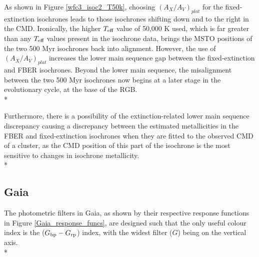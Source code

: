 \documentclass[12pt, a4paper]{report}
\begin{document}
As shown in Figure \ref{wfc3_isoc2_T50k}, choosing $(A_{X}/A_{V})_{plat}$ for the fixed-extinction isochrones leads to those isochrones shifting down and to the right in the CMD. Ironically, the higher $T_{\textnormal{eff}}$ value of 50,000 K used, which is far greater than any $T_{\textnormal{eff}}$ values present in the isochrone data, brings the MSTO positions of the two 500 Myr isochrones back into alignment. However, the use of $(A_{X}/A_{V})_{plat}$ increases the lower main sequence gap between the fixed-extinction and FBER isochrones. Beyond the lower main sequence, the misalignment between the two 500 Myr isochrones now begins at a later stage in the evolutionary cycle, at the base of the RGB. \\*

Furthermore, there is a possibility of the extinction-related lower main sequence discrepancy causing a discrepancy between the estimated metallicities in the FBER and fixed-extinction isochrones when they are fitted to the observed CMD of a cluster, as the CMD position of this part of the isochrone is the most sensitive to changes in isochrone metallicity.\\*

\subsection{Gaia} \label{Gaia_isoc}

The photometric filters in Gaia, as shown by their respective response functions in Figure \ref{Gaia_response_funcs}, are designed such that the only useful colour index is the ($G_{\textnormal{bp}}-G_{\textnormal{rp}}$) index, with the widest filter ($G$) being on the vertical axis.\\*
\end{document}
